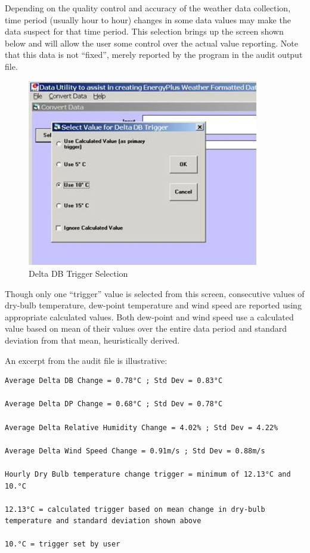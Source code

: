 Depending on the quality control and accuracy of the weather data collection, time period (usually hour to hour) changes in some data values may make the data suspect for that time period. This selection brings up the screen shown below and will allow the user some control over the actual value reporting. Note that this data is not ``fixed'', merely reported by the program in the audit output file.

\begin{figure}[hbtp] %
\centering
\includegraphics[width=0.9\textwidth, height=0.9\textheight, keepaspectratio=true]{media/image002.jpg}
\caption{Delta DB Trigger Selection \protect \label{fig:delta-db-trigger-selection}}
\end{figure}

Though only one ``trigger'' value is selected from this screen, consecutive values of dry-bulb temperature, dew-point temperature and wind speed are reported using appropriate calculated values. Both dew-point and wind speed use a calculated value based on mean of their values over the entire data period and standard deviation from that mean, heuristically derived.

An excerpt from the audit file is illustrative:

\begin{lstlisting}
Average Delta DB Change = 0.78°C ; Std Dev = 0.83°C

Average Delta DP Change = 0.68°C ; Std Dev = 0.78°C

Average Delta Relative Humidity Change = 4.02% ; Std Dev = 4.22%

Average Delta Wind Speed Change = 0.91m/s ; Std Dev = 0.88m/s

Hourly Dry Bulb temperature change trigger = minimum of 12.13°C and 10.°C

12.13°C = calculated trigger based on mean change in dry-bulb temperature and standard deviation shown above

10.°C = trigger set by user
\end{lstlisting}

